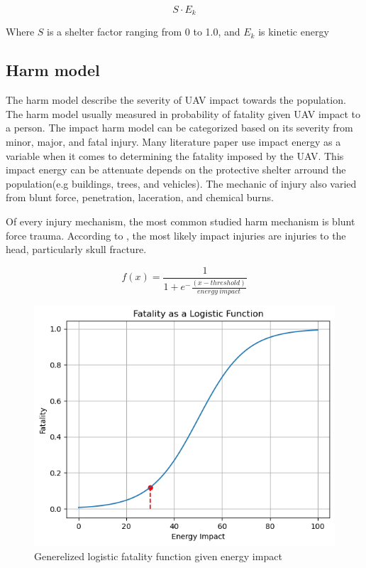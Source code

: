 \documentclass[12pt]{report}
\begin{document}
            \begin{equation}\label{eq:shelter_factor}
                S \cdot E_k
            \end{equation}

            Where \(S\) is a shelter factor ranging from 0 to 1.0, and \(E_k\) is kinetic energy
            
        \subsection{Harm model}
            The harm model describe the severity of UAV impact towards the population. The harm model usually measured
            in probability of fatality given UAV impact to a person. The impact harm model can be categorized based on
            its severity from minor, major, and fatal injury. Many literature paper use impact energy as a variable when
            it comes to determining the fatality imposed by the UAV. This impact energy can be attenuate depends on the
            protective shelter arround the population(e.g buildings, trees, and vehicles). The mechanic of injury also
            varied from blunt force, penetration, laceration, and chemical burns. 
            
            Of every injury mechanism, the most common studied harm mechanism is blunt force trauma. According to  \cite{shelley_model_2016},
            the most likely impact injuries are injuries to the head, particularly skull fracture.

            \begin{equation}
                f(x) = \frac{1}{1+e^-\frac{(x-threshold)}{energy \ impact}}
            \end{equation}

            \begin{figure}[H]
                \centering
                \includegraphics[width=\textwidth]{Plot/logistic_bounded.png}
                \caption{Generelized logistic fatality function given energy impact}
            \end{figure}
\end{document}
